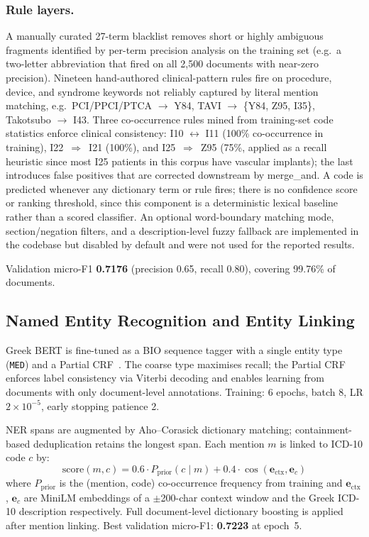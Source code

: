\subsubsection{Rule layers.}
A manually curated 27-term blacklist removes short or highly ambiguous fragments
identified by per-term precision analysis on the training set (e.g.\ a two-letter
abbreviation that fired on all 2,500 documents with near-zero precision). Nineteen
hand-authored clinical-pattern rules fire on procedure, device, and syndrome
keywords not reliably captured by literal mention matching, e.g.\ PCI/PPCI/PTCA
$\to$ Y84, TAVI $\to$ \{Y84, Z95, I35\}, Takotsubo $\to$ I43. Three co-occurrence
rules mined from training-set code statistics enforce clinical consistency: I10
$\leftrightarrow$ I11 (100\% co-occurrence in training), I22~$\Rightarrow$~I21
(100\%), and I25~$\Rightarrow$~Z95 (75\%, applied as a recall heuristic since most
I25 patients in this corpus have vascular implants); the last introduces false
positives that are corrected downstream by merge\_and. A code is predicted whenever
any dictionary term or rule fires; there is no confidence score or ranking
threshold, since this component is a deterministic lexical baseline rather than a
scored classifier. An optional word-boundary matching mode, section/negation
filters, and a description-level fuzzy fallback are implemented in the codebase but
disabled by default and were not used for the reported results.

Validation micro-F1 \textbf{0.7176} (precision 0.65, recall 0.80), covering 99.76\% of documents.

\subsection{Named Entity Recognition and Entity Linking}
\label{subsec:nerel}

Greek BERT is fine-tuned as a BIO sequence tagger with a single entity type
(\texttt{MED}) and a Partial CRF~\cite{tsuboi2008partial}. The coarse type maximises
recall; the Partial CRF enforces label consistency via Viterbi decoding and enables
learning from documents with only document-level annotations.
Training: 6 epochs, batch 8, LR $2\times10^{-5}$, early stopping patience 2.

NER spans are augmented by Aho--Corasick dictionary matching; containment-based
deduplication retains the longest span. Each mention $m$ is linked to ICD-10 code $c$
by:
\begin{equation}
\text{score}(m,c) = 0.6\cdot P_{\text{prior}}(c\mid m)
                  + 0.4\cdot\cos(\mathbf{e}_{\text{ctx}},\mathbf{e}_c)
\end{equation}
where $P_{\text{prior}}$ is the (mention, code) co-occurrence frequency from training
and $\mathbf{e}_{\text{ctx}}$, $\mathbf{e}_c$ are MiniLM embeddings of a
$\pm$200-char context window and the Greek ICD-10 description respectively.
Full document-level dictionary boosting is applied after mention linking.
Best validation micro-F1: \textbf{0.7223} at epoch~5.

